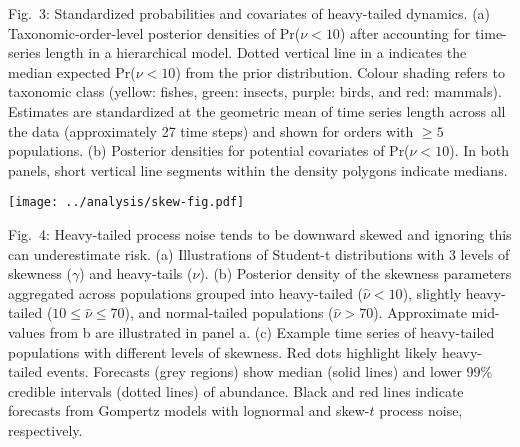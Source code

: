 Fig.~3: Standardized probabilities and covariates of heavy-tailed
dynamics. (a) Taxonomic-order-level posterior densities of Pr(\(\nu
< 10\)) after accounting for time-series length in a hierarchical model. Dotted
vertical line in a indicates the median expected Pr(\(\nu < 10\)) from the
prior distribution. Colour shading refers to taxonomic class (yellow: fishes,
green: insects, purple: birds, and red: mammals). Estimates are standardized at
the geometric mean of time series length across all the data (approximately 27
time steps) and shown for orders with \(\ge 5\) populations. (b)
Posterior densities for potential covariates of Pr(\(\nu < 10\)). In both
panels, short vertical line segments within the density polygons indicate
medians.

\clearpage

\begin{center}
\texttt{[image: ../analysis/skew-fig.pdf]}
\end{center}

Fig.~4: Heavy-tailed process noise tends to be downward skewed and
ignoring this can underestimate risk. (a) Illustrations of Student-t
distributions with 3 levels of skewness (\(\gamma\)) and heavy-tails (\(\nu\)).
(b) Posterior density of the skewness parameters aggregated across
populations grouped into heavy-tailed (\(\hat{\nu} < 10\)), slightly
heavy-tailed (\(10 \leq \hat{\nu} \leq 70\)), and normal-tailed populations
(\(\hat{\nu} > 70\)). Approximate mid-values from b are illustrated in
panel a. (c) Example time series of heavy-tailed populations with
different levels of skewness. Red dots highlight likely heavy-tailed events.
Forecasts (grey regions) show median (solid lines) and lower 99\% credible
intervals (dotted lines) of abundance. Black and red lines indicate forecasts
from Gompertz models with lognormal and skew-$t$ process noise, respectively.

